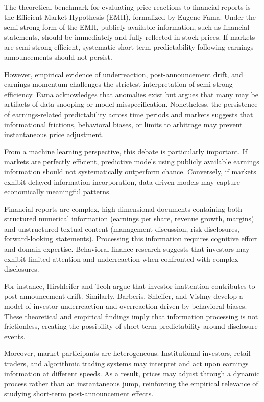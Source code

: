 The theoretical benchmark for evaluating price reactions to financial reports is the Efficient Market Hypothesis (EMH), formalized by Eugene Fama\cite{efficient-capital-markets}. 
Under the semi-strong form of the EMH, publicly available information, such as financial statements, should be immediately and fully reflected in stock prices. 
If markets are semi-strong efficient, systematic short-term predictability following earnings announcements should not persist.

However, empirical evidence of underreaction, post-announcement drift, and earnings momentum challenges the strictest interpretation of semi-strong efficiency. 
Fama\cite{market-efficiency-long-term-returns} acknowledges that anomalies exist but argues that many may be artifacts of data-snooping or model misspecification. 
Nonetheless, the persistence of earnings-related predictability across time periods and markets suggests that informational frictions, behavioral biases, or limits to arbitrage may prevent instantaneous price adjustment.

From a machine learning perspective, this debate is particularly important. If markets are perfectly efficient, predictive models using publicly available earnings information should not systematically outperform chance. 
Conversely, if markets exhibit delayed information incorporation, data-driven models may capture economically meaningful patterns.

Financial reports are complex, high-dimensional documents containing both structured numerical information (earnings per share, revenue growth, margins) and unstructured textual content (management discussion, risk disclosures, forward-looking statements). 
Processing this information requires cognitive effort and domain expertise. 
Behavioral finance research suggests that investors may exhibit limited attention and underreaction when confronted with complex disclosures.

For instance, Hirshleifer and Teoh\cite{limited-attention-information-disclosure} argue that investor inattention contributes to post-announcement drift. 
Similarly, Barberis, Shleifer, and Vishny\cite{model-of-investor-sentiment} develop a model of investor underreaction and overreaction driven by behavioral biases. 
These theoretical and empirical findings imply that information processing is not frictionless, creating the possibility of short-term predictability around disclosure events.

Moreover, market participants are heterogeneous. 
Institutional investors, retail traders, and algorithmic trading systems may interpret and act upon earnings information at different speeds. 
As a result, prices may adjust through a dynamic process rather than an instantaneous jump, reinforcing the empirical relevance of studying short-term post-announcement effects.


